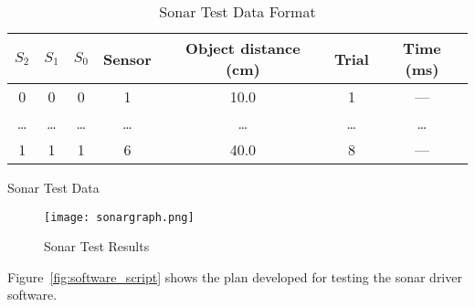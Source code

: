 \documentclass{article}
\begin{document}
    \begin{table}[htb]
        \centering
        \begin{tabular}{|c|c|c|c|c|c|c|}
            \hline
            \textbf{$S_2$}
                & \textbf{$S_1$}
                & \textbf{$S_0$}
                & \textbf{Sensor}
                & \textbf{Object distance (\si{\centi\meter})}
                & \textbf{Trial}
                & \textbf{Time (\si{\milli\second})}
            \\ \hline
            0 & 0 & 0 & 1 & 10.0 & 1 & --- \\ \hline
            \ldots
                & \ldots
                & \ldots
                & \ldots
                & \ldots
                & \ldots
                & \ldots \\ \hline
            1 & 1 & 1 & 6 & 40.0 & 8 & --- \\ \hline
        \end{tabular}
        \caption{Sonar Test Data Format}
        \label{tab:sonar_format}
    \end{table}
    
    \begin{table}[htb]
        \centering
        
        \caption{Sonar Test Data}
        \label{tab:sonar_data}
    \end{table}

    \begin{sidewaysfigure}[htb]
        \centering
        \texttt{[image: sonargraph.png]}
        \caption{Sonar Test Results}
        \label{fig:sonar_results}
    \end{sidewaysfigure}

    Figure~\ref{fig:software_script} shows the plan developed for testing the sonar driver software.
\end{document}
